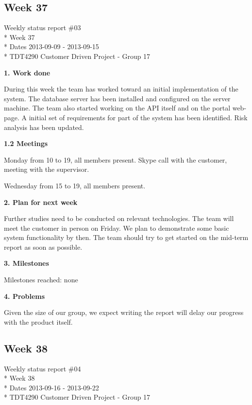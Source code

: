 \newpage
\subsection{Week 37}

\begin{center}
Weekly status report \#03\\*
Week 37 \\*
Dates 2013-09-09 - 2013-09-15 \\*
TDT4290 Customer Driven Project - Group 17
\end{center}

\textbf{1. Work done}

During this week the team has worked toward an initial implementation of the system. 
The database server has been installed and configured on the server machine. The team also started working on the API itself and on the portal web-page. 
A initial set of requirements for part of the system has been identified. Risk analysis has been updated.

\textbf{1.2 Meetings}

Monday
from 10 to 19, all members present.
Skype call with the customer, meeting with the supervisor.

Wednesday
from 15 to 19, all members present.

\textbf{2. Plan for next week}

Further studies need to be conducted on relevant technologies. 
The team will meet the customer in person on Friday. 
We plan to demonstrate some basic system functionality by then. 
The team should try to get started on the mid-term report as soon as possible.

\textbf{3. Milestones}

Milestones reached: none

\textbf{4. Problems}

Given the size of our group, we expect writing the report will delay our progress with the product itself.


\newpage
\subsection{Week 38}

\begin{center}
Weekly status report \#04\\*
Week 38 \\*
Dates 2013-09-16 - 2013-09-22 \\*
TDT4290 Customer Driven Project - Group 17
\end{center}

